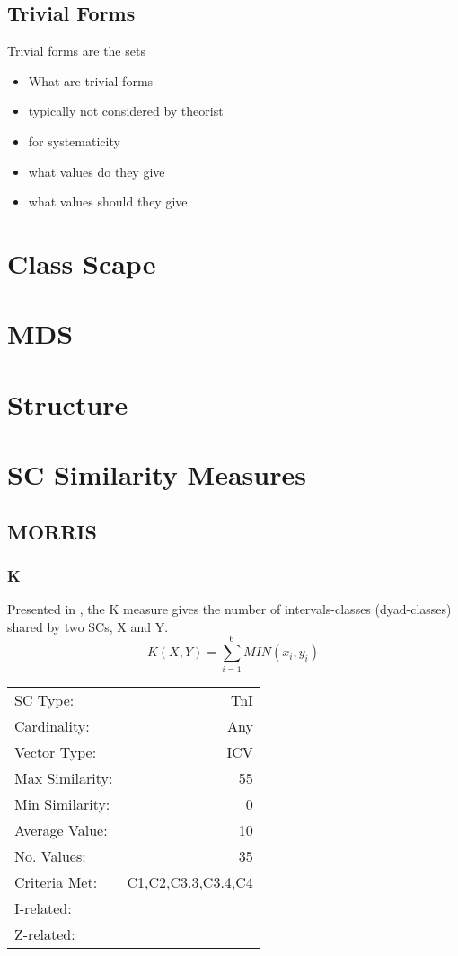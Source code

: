 \documentclass{article}
\begin{document}
\subsection{Trivial Forms}
\label{sec-7-5}

Trivial forms are the sets 
\begin{itemize}
\item What are trivial forms
\item typically not considered by theorist
\item for systematicity
\item what values do they give
\item what values should they give
\end{itemize}
\section{Class Scape}
\label{sec-8}
\section{MDS}
\label{sec-9}
\section{Structure}
\label{sec-10}
\section{SC Similarity Measures}
\label{sec-11}
\subsection{MORRIS}
\label{sec-11-1}
\subsubsection{K}
\label{sec-11-1-1}

Presented in \citet[pp. 448]{Morris1979}, the K measure gives the
number of intervals-classes (dyad-classes) shared by two SCs, X and Y.
$$ K(X,Y)= \sum_{i=1}^{6}{MIN(x_{i},y_{i})} $$

\begin{center}
\begin{tabular}{lr}
 SC Type:         &                 TnI  \\
 Cardinality:     &                 Any  \\
 Vector Type:     &                 ICV  \\
 Max Similarity:  &                  55  \\
 Min Similarity:  &                   0  \\
 Average Value:   &                  10  \\
 No. Values:      &                  35  \\
 Criteria Met:    &  C1,C2,C3.3,C3.4,C4  \\
 I-related:       &                      \\
 Z-related:       &                      \\
\end{tabular}
\end{center}
\end{document}
